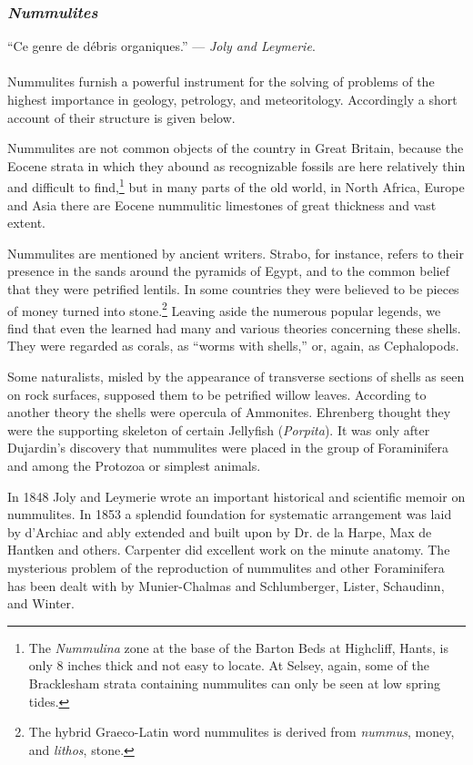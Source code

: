 \documentclass[a4paper, 12pt, oneside]{article}
\begin{document}
\subsubsection{\emph{Nummulites}}
\begin{displayquote}
``Ce genre de débris organiques.'' --- \emph{Joly and Leymerie}.
\end{displayquote}
\paragraph{}
Nummulites furnish a powerful instrument for the solving of problems of the highest importance in geology, petrology, and meteoritology. Accordingly a short account of their structure is given below.

Nummulites are not common objects of the country in Great Britain, because the Eocene strata in which they abound as recognizable fossils are here relatively thin and difficult to find,\footnote{The \emph{Nummulina} zone at the base of the Barton Beds at Highcliff, Hants, is only 8 inches thick and not easy to locate. At Selsey, again, some of the Bracklesham strata containing nummulites can only be seen at low spring tides.} but in many parts of the old world, in North Africa, Europe and Asia there are Eocene nummulitic limestones of great thickness and vast extent.

Nummulites are mentioned by ancient writers. Strabo, for instance, refers to their presence in the sands around the pyramids of Egypt, and to the common belief that they were petrified lentils. In some countries they were believed to be pieces of money turned into stone.\footnote{The hybrid Graeco-Latin word nummulites is derived from \emph{nummus}, money, and \emph{lithos}, stone.} Leaving aside the numerous popular legends, we find that even the learned had many and various theories concerning these shells. They were regarded as corals, as ``worms with shells,'' or, again, as Cephalopods.

Some naturalists, misled by the appearance of transverse sections of shells as seen on rock surfaces, supposed them to be petrified willow leaves. According to another theory the shells were opercula of Ammonites. Ehrenberg thought they were the supporting skeleton of certain Jellyfish (\emph{Porpita}). It was only after Dujardin's discovery that nummulites were placed in the group of Foraminifera and among the Protozoa or simplest animals.

In 1848 Joly and Leymerie wrote an important historical and scientific memoir on nummulites. In 1853 a splendid foundation for systematic arrangement was laid by d'Archiac and ably extended and built upon by Dr. de la Harpe, Max de Hantken and others. Carpenter did excellent work on the minute anatomy. The mysterious problem of the reproduction of nummulites and other Foraminifera has been dealt with by Munier-Chalmas and Schlumberger, Lister, Schaudinn, and Winter.
\end{document}
